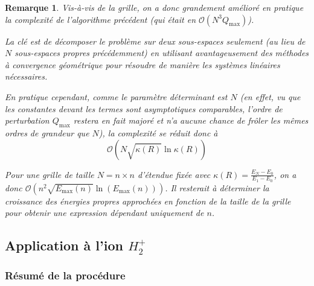 \documentclass[svgnames,dvipsnames,a4paper,10pt,french]{report}
\newtheorem{remark}[theorem]{Remarque}
\begin{document}
\begin{remark}
Vis-à-vis de la grille, on a donc grandement amélioré en pratique la complexité de l'algorithme précédent (qui était en $\mathcal{O}(N^3 Q_\text{max})$).

La clé est de décomposer le problème sur deux sous-espaces seulement (au lieu de $N$ sous-espaces propres précédemment) en utilisant avantageusement des méthodes à convergence géométrique pour résoudre de manière les systèmes linéaires nécessaires.

En pratique cependant, comme le paramètre déterminant est $N$ (en effet, vu que les constantes devant les termes sont asymptotiques comparables, l'ordre de perturbation $Q_\text{max}$ restera en fait majoré et n'a aucune chance de frôler les mêmes ordres de grandeur que $N$), la complexité se réduit donc à
\begin{equation}
    \mathcal{O}\left(N\sqrt{\kappa(R)} \ln \kappa(R) \right)
\end{equation}

Pour une grille de taille $N=n \times n$ d'étendue fixée avec $\kappa(R)= \frac{E_N-E_0}{E_1-E_0}$, on a donc $\mathcal{O}\left(n^2 \sqrt{E_\text{max}(n)} \ln(E_\text{max}(n)) \right)$.  Il resterait à déterminer la croissance des énergies propres approchées en fonction de la taille de la grille pour obtenir une expression dépendant uniquement de $n$.
\end{remark}



\subsection{Application à l'ion $H_2^+$}

\subsubsection{Résumé de la procédure}
\end{document}
